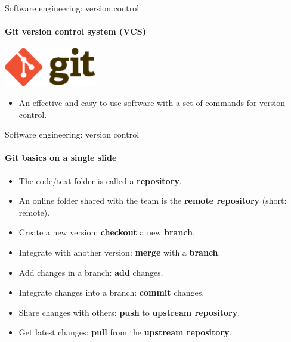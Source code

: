 \begin{frame}{Software engineering: version control}
    \framesubtitle{Git version control system (VCS)}

    \vfill
    \begin{center}
        \includegraphics[width=0.3\textwidth]{figures/Git-Logo-2Color.eps}
    \end{center}

    \begin{itemize}
        \item An effective and easy to use software with a set of commands for version control. 
    \end{itemize}

\end{frame}

\begin{frame}{Software engineering: version control}
    \framesubtitle{Git basics on a single slide}

    \vfill
    \begin{itemize}
        \item The code/text folder is called a \textbf{repository}.
        \item An online folder shared with the team is the \textbf{remote repository} (short: remote).
        \item Create a new version: \textbf{checkout} a new \textbf{branch}.  
        \item Integrate with another version: \textbf{merge} with a \textbf{branch}.
        \item Add changes in a branch: \textbf{add} changes.
        \item Integrate changes into a branch: \textbf{commit} changes.
        \item Share changes with others: \textbf{push} to \textbf{upstream repository}. 
        \item Get latest changes: \textbf{pull} from the \textbf{upstream repository}.
    \end{itemize}

\end{frame}

